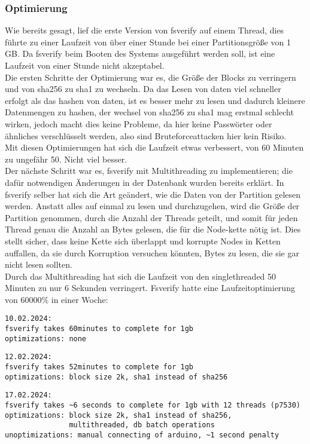 \subsubsection{Optimierung}
Wie bereits gesagt, lief die erste Version von fsverify auf einem Thread, dies führte zu einer Laufzeit von über einer Stunde bei einer Partitionsgröße von 1 GB. Da fsverify beim Booten des Systems ausgeführt werden soll, ist eine Laufzeit von einer Stunde nicht akzeptabel.
\\
Die ersten Schritte der Optimierung war es, die Größe der Blocks zu verringern und von sha256 zu sha1 zu wechseln. Da das Lesen von daten viel schneller erfolgt als das hashen von daten, ist es besser mehr zu lesen und dadurch kleinere Datenmengen zu hashen, der wechsel von sha256 zu sha1 mag erstmal schlecht wirken, jedoch macht dies keine Probleme, da hier keine Passwörter oder ähnliches verschlüsselt werden, also sind Bruteforceattacken hier kein Risiko.\\
Mit diesen Optimierungen hat sich die Laufzeit etwas verbessert, von 60 Minuten zu ungefähr 50. Nicht viel besser.
\\
Der nächste Schritt war es, fsverify mit Multithreading zu implementieren; die dafür notwendigen Änderungen in der Datenbank wurden bereits erklärt. In fsverify selber hat sich die Art geändert, wie die Daten von der Partition gelesen werden. Anstatt alles auf einmal zu lesen und durchzugehen, wird die Größe der Partition genommen, durch die Anzahl der Threads geteilt, und somit für jeden Thread genau die Anzahl an Bytes gelesen, die für die Node-kette nötig ist. Dies stellt sicher, dass keine Kette sich überlappt und korrupte Nodes in Ketten auffallen, da sie durch Korruption versuchen könnten, Bytes zu lesen, die sie gar nicht lesen sollten.\\
Durch das Multithreading hat sich die Laufzeit von den singlethreaded 50 Minuten zu nur 6 Sekunden verringert.
\bigbreak \noindent
Fsverify hatte eine Laufzeitoptimierung von 60000\% in einer Woche:
\begin{verbatim}
10.02.2024:
fsverify takes 60minutes to complete for 1gb
optimizations: none
\end{verbatim}
\pagebreak
\begin{verbatim}
12.02.2024:
fsverify takes 52minutes to complete for 1gb
optimizations: block size 2k, sha1 instead of sha256
\end{verbatim}
\begin{verbatim}
17.02.2024:
fsverify takes ~6 seconds to complete for 1gb with 12 threads (p7530)
optimizations: block size 2k, sha1 instead of sha256,
               multithreaded, db batch operations
unoptimizations: manual connecting of arduino, ~1 second penalty
\end{verbatim}

